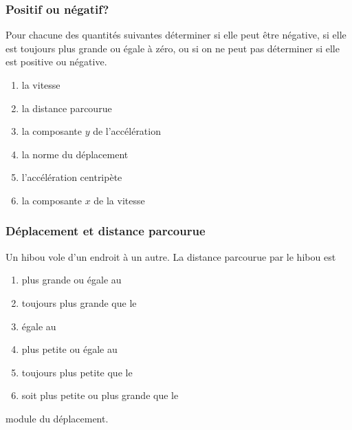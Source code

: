 \documentclass{beamer}
\begin{document}
\begin{frame}
  \frametitle{Positif ou négatif?}

  Pour chacune des quantités suivantes déterminer si elle peut être négative,
  si elle est toujours plus grande ou égale à zéro, ou si on ne peut pas
  déterminer si elle est positive ou négative.

  \begin{enumerate}
    \item la vitesse 
    \item la distance parcourue 
    \item la composante $y$ de l'accélération 
    \item la norme du déplacement 
    \item l'accélération centripète 
    \item la composante $x$ de la vitesse 
  \end{enumerate}
\end{frame}


\begin{frame}
  \frametitle{Déplacement et distance parcourue}

  Un hibou vole d'un endroit à un autre. La distance parcourue par le hibou est
  \begin{enumerate}
    \item \alert<2>{plus grande ou égale au}
    \item toujours plus grande que le
    \item égale au
    \item plus petite ou égale au
    \item toujours plus petite que le
    \item soit plus petite ou plus grande que le
  \end{enumerate}
  module du déplacement.

\end{frame}
\end{document}
